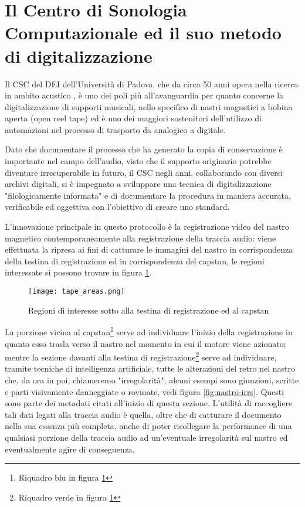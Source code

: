 \section{Il Centro di Sonologia Computazionale ed il suo metodo di digitalizzazione} \label{sec:csc-digitalizzazione}
Il \ac{CSC} del \ac{DEI} dell'Università di Padova, che da circa 50 anni opera nella ricerca in ambito acustico \cite{canazzaGestureMusicComputer2022}, è uno dei poli più all'avanguardia per quanto concerne la digitalizzazione di supporti musicali, nello specifico di nastri magnetici a bobina aperta (open reel tape) ed è uno dei maggiori sostenitori dell'utilizzo di automazioni nel processo di trasporto da analogico a digitale.

Dato che documentare il processo che ha generato la copia di conservazione è importante nel campo dell'audio, visto che il supporto originario potrebbe diventare irrecuperabile in futuro, il \ac{CSC} negli anni, collaborando con diversi archivi digitali, si è impegnato a sviluppare una tecnica di digitalizzazione "filologicamente informata" e di documentare la procedura in maniera accurata, verificabile ed oggettiva con l'obiettivo di creare uno standard.

L'innovazione principale in questo protocollo è la registrazione video del nastro magnetico contemporaneamente alla registrazione della traccia audio: viene effettuata la ripresa ai fini di catturare le immagini del nastro in corrispondenza della testina di registrazione ed in corrispondenza del capstan, le regioni interessate si possono trovare in figura \ref{fig:tape-areas}.

\begin{figure}[h]
    \centering
    \texttt{[image: tape\_areas.png]}
    \caption{Regioni di interesse sotto alla testina di registrazione ed al capstan \cite{russoEnhancingPreservationRestoration}}
    \label{fig:tape-areas}
\end{figure}

La porzione vicina al capstan\footnote{Riquadro blu in figura \ref{fig:tape-areas}} serve ad individuare l'inizio della registrazione in quanto esso trasla verso il nastro nel momento in cui il motore viene azionato; mentre la sezione davanti alla testina di registrazione\footnote{Riquadro verde in figura \ref{fig:tape-areas}} serve ad individuare, tramite tecniche di intelligenza artificiale, tutte le alterazioni del retro nel nastro che, da ora in poi, chiameremo "irregolarità"; alcuni esempi sono giunzioni, scritte e parti visivamente danneggiate o rovinate, vedi figura \ref{fig:nastro-irrs}.
Questi sono parte dei metadati citati all'inizio di questa sezione.
L'utilità di raccogliere tali dati legati alla traccia audio è quella, oltre che di catturare il documento nella sua essenza più completa, anche di poter ricollegare la performance di una qualsiasi porzione della traccia audio ad un'eventuale irregolarità sul nastro ed eventualmente agire di conseguenza.

